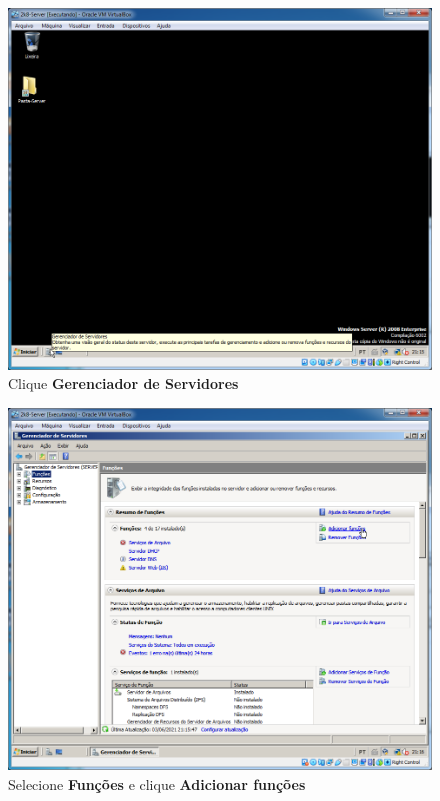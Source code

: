 \documentclass[10pt]{article}
\begin{document}
\begin{figure}[H]
    \centering
    \caption{Clique \textbf{Gerenciador de Servidores}}
    \label{fig:re013}
    \includegraphics[width=\linewidth]{images/rede_externa/re013.png}
\end{figure}
\begin{figure}[H]
    \centering
    \caption{Selecione \textbf{Funções} e clique \textbf{Adicionar funções}}
    \label{fig:re014}
    \includegraphics[width=\linewidth]{images/rede_externa/re014.png}
\end{figure}
\end{document}
